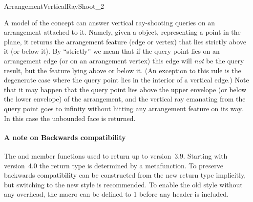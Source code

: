 
\ccRefPageBegin

\begin{ccRefConcept}{ArrangementVerticalRayShoot_2}

\ccDefinition

A model of the \ccRefName{} concept can answer vertical ray-shooting
queries on an arrangement attached to it. Namely, given a
 object, representing a point in the plane,
it returns the arrangement feature (edge or vertex) that lies
strictly above it (or below it). By ``strictly'' we mean that if the
query point lies on an arrangement edge (or on an arrangement vertex)
this edge will \emph{not} be the query result, but the feature lying
above or below it. (An exception to this rule is the degenerate case
where the query point lies in the interior of a vertical edge.) Note
that it may happen that the query point lies above the upper envelope
(or below the lower envelope) of the arrangement, and the vertical ray
emanating from the query point goes to infinity without hitting any
arrangement feature on its way. In this case the unbounded face is
returned.

\paragraph{A note on Backwards compatibility}
The  and  member functions used
to return  up to \cgal{} version~3.9. Starting with
\cal{} version~4.0 the return type is determined by a metafunction. To
preserve backwards compatibility  can be constructed
from the new return type implicitly, but switching to the new style
is recommended. To enable the old style without any overhead, the macro
 can be defined to 1 before any
\cgal{} header is included.

\ccTypes




\end{ccRefConcept}

